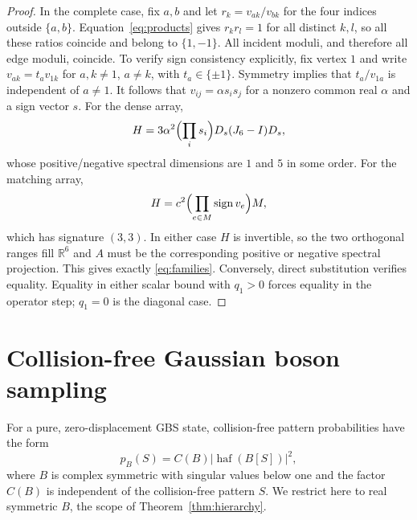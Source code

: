 \documentclass[11pt]{article}
\theoremstyle{remark}\newtheorem{remark}[theorem]{Remark}
\DeclareMathOperator{\haf}{haf}\DeclareMathOperator{\tr}{tr}
\newcommand{\R}{\mathbb R}\newcommand{\op}{\mathrm{op}}
\begin{document}
\begin{proof}
In the complete case, fix $a,b$ and let $r_k=v_{ak}/v_{bk}$ for the four
indices outside $\{a,b\}$. Equation~\eqref{eq:products} gives $r_kr_l=1$
for all distinct $k,l$, so all these ratios coincide and belong to $\{1,-1\}$.
All incident moduli, and therefore all edge moduli, coincide. To verify
sign consistency explicitly, fix vertex $1$ and write
$v_{ak}=t_a v_{1k}$ for $a,k\ne1$, $a\ne k$, with $t_a\in\{\pm1\}$.
Symmetry implies that $t_a/v_{1a}$ is independent of $a\ne1$.
It follows that $v_{ij}=\alpha s_is_j$ for a nonzero common real $\alpha$
and a sign vector $s$.
For the dense array,
\[
H=3\alpha^2\Bigl(\prod_i s_i\Bigr)D_s(J_6-I)D_s,
\]
whose positive/negative spectral dimensions are $1$ and $5$ in some order.
For the matching array,
\[
H=c^2\Bigl(\prod_{e\in M}\operatorname{sign}v_e\Bigr)M,
\]
which has signature $(3,3)$.  In either case $H$ is invertible, so the two
orthogonal ranges fill $\R^6$ and $A$ must be the corresponding positive or
negative spectral projection.  This gives exactly \eqref{eq:families}.
Conversely, direct substitution verifies equality.  Equality in either scalar
bound with $q_1>0$ forces equality in the operator step; $q_1=0$ is the
diagonal case.
\end{proof}

\section{Collision-free Gaussian boson sampling}\label{sec:gbs}
For a pure, zero-displacement GBS state, collision-free pattern probabilities
have the form~\cite{hamilton,kruse}
\begin{equation}\label{eq:gbsprob}
p_B(S)=C(B)|\haf(B[S])|^2,
\end{equation}
where $B$ is complex symmetric with singular values below one and the factor
$C(B)$ is independent of the collision-free pattern $S$.  We restrict here to
real symmetric $B$, the scope of Theorem~\ref{thm:hierarchy}.
\end{document}

